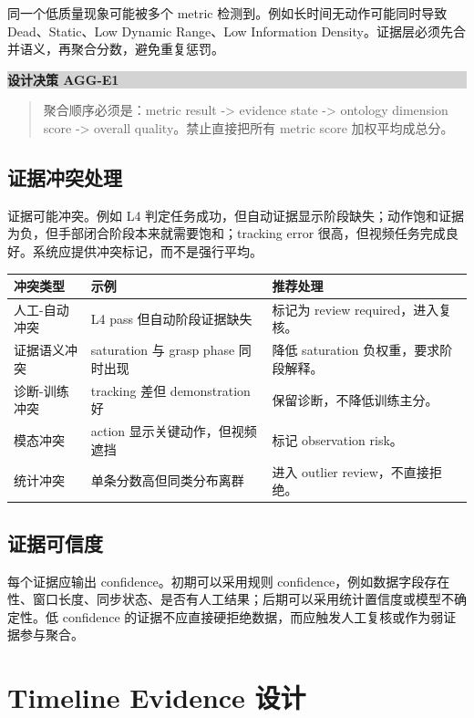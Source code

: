 \documentclass[UTF8,zihao=-4]{ctexart}
\newenvironment{decisionbox}[1]{\vspace{0.5em}\noindent\colorbox{LightGray}{\parbox{0.96\linewidth}{\textbf{#1}}}\par\vspace{-0.2em}\begin{quote}\small}{\end{quote}\vspace{0.3em}}
\begin{document}
同一个低质量现象可能被多个 metric 检测到。例如长时间无动作可能同时导致 Dead、Static、Low Dynamic Range、Low Information Density。证据层必须先合并语义，再聚合分数，避免重复惩罚。

\begin{decisionbox}{设计决策 AGG-E1}
聚合顺序必须是：metric result -> evidence state -> ontology dimension score -> overall quality。禁止直接把所有 metric score 加权平均成总分。
\end{decisionbox}

\subsection{证据冲突处理}

证据可能冲突。例如 L4 判定任务成功，但自动证据显示阶段缺失；动作饱和证据为负，但手部闭合阶段本来就需要饱和；tracking error 很高，但视频任务完成良好。系统应提供冲突标记，而不是强行平均。

\begin{longtable}{L{3.5cm} L{5cm} L{5.4cm}}
\toprule
冲突类型 & 示例 & 推荐处理 \\
\midrule
人工-自动冲突 & L4 pass 但自动阶段证据缺失 & 标记为 review required，进入复核。 \\
证据语义冲突 & saturation 与 grasp phase 同时出现 & 降低 saturation 负权重，要求阶段解释。 \\
诊断-训练冲突 & tracking 差但 demonstration 好 & 保留诊断，不降低训练主分。 \\
模态冲突 & action 显示关键动作，但视频遮挡 & 标记 observation risk。 \\
统计冲突 & 单条分数高但同类分布离群 & 进入 outlier review，不直接拒绝。 \\
\bottomrule
\end{longtable}

\subsection{证据可信度}

每个证据应输出 confidence。初期可以采用规则 confidence，例如数据字段存在性、窗口长度、同步状态、是否有人工结果；后期可以采用统计置信度或模型不确定性。低 confidence 的证据不应直接硬拒绝数据，而应触发人工复核或作为弱证据参与聚合。

\section{Timeline Evidence 设计}
\end{document}
